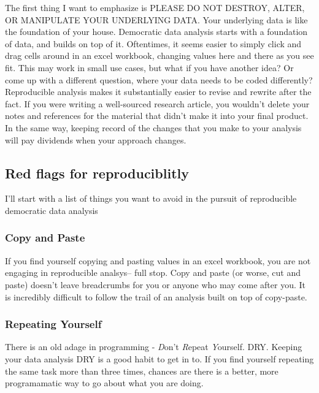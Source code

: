 \documentclass[]{book}
\begin{document}
The first thing I want to emphasize is PLEASE DO NOT DESTROY, ALTER, OR MANIPULATE YOUR UNDERLYING DATA. Your underlying data is like the foundation of your house. Democratic data analysis starts with a foundation of data, and builds on top of it. Oftentimes, it seems easier to simply click and drag cells around in an excel workbook, changing values here and there as you see fit. This may work in small use cases, but what if you have another idea? Or come up with a different question, where your data needs to be coded differently? Reproducible analysis makes it substantially easier to revise and rewrite after the fact. If you were writing a well-sourced research article, you wouldn't delete your notes and references for the material that didn't make it into your final product. In the same way, keeping record of the changes that you make to your analysis will pay dividends when your approach changes.

\hypertarget{red-flags-for-reproduciblitly}{%
\subsection{Red flags for reproduciblitly}\label{red-flags-for-reproduciblitly}}

I'll start with a list of things you want to avoid in the pursuit of reproducible democratic data analysis

\hypertarget{copy-and-paste}{%
\subsubsection{Copy and Paste}\label{copy-and-paste}}

If you find yourself copying and pasting values in an excel workbook, you are not engaging in reproducible analsys-- full stop. Copy and paste (or worse, cut and paste) doesn't leave breadcrumbs for you or anyone who may come after you. It is incredibly difficult to follow the trail of an analysis built on top of copy-paste.

\hypertarget{repeating-yourself}{%
\subsubsection{Repeating Yourself}\label{repeating-yourself}}

There is an old adage in programming - \emph{D}on't \emph{R}epeat \emph{Y}ourself. DRY. Keeping your data analysis DRY is a good habit to get in to. If you find yourself repeating the same task more than three times, chances are there is a better, more programamatic way to go about what you are doing.
\end{document}
